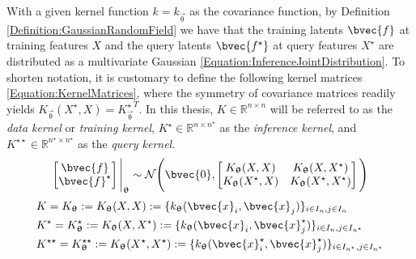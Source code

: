 				With a given kernel function $k = k_{\vec{\uptheta}}$ as the covariance function, by Definition \ref{Definition:GaussianRandomField} we have that the training latents $\bvec{f}$ at training features $X$ and the query latents $\bvec{f^{\star}}$ at query features $X^{\star}$ are distributed as a multivariate Gaussian \eqref{Equation:InferenceJointDistribution}. To shorten notation, it is customary to define the following kernel matrices \eqref{Equation:KernelMatrices}, where the symmetry of covariance matrices readily yields $K_{\vec{\uptheta}}(X^{\star}, X) = {K_{\vec{\uptheta}}^{\star}}^{T}$. In this thesis, $K \in \mathbb{R}^{n \times n}$ will be referred to as the \textit{data kernel} or \textit{training kernel}, $K^{\star} \in \mathbb{R}^{n \times n^{\star}}$ as the \textit{inference kernel}, and $K^{\star \star} \in \mathbb{R}^{n^{\star} \times n^{\star}}$ as the \textit{query kernel}. \begin{equation}
					\begin{bmatrix}
						\bvec{f} \\ \bvec{f}^{\star}
					\end{bmatrix} \Bigg|_{\vec{\uptheta}}
					\sim \mathcal{N}\Bigg(\bvec{0}, \begin{bmatrix}
														K_{\vec{\uptheta}}(X, X) & K_{\vec{\uptheta}}(X, X^{\star}) \\
														K_{\vec{\uptheta}}(X^{\star}, X) & K_{\vec{\uptheta}}(X^{\star}, X^{\star}) \\
													\end{bmatrix}  \Bigg)
				\label{Equation:InferenceJointDistribution}
				\end{equation} \begin{equation}
					\begin{aligned}
						& K = K_{\vec{\uptheta}} := K_{\vec{\uptheta}}(X, X) := \{k_{\vec{\uptheta}}(\bvec{x}_{i}, \bvec{x}_{j})\}_{i \in I_{n}, j \in I_{n}} \\
						& K^{\star} = K_{\vec{\uptheta}}^{\star} := K_{\vec{\uptheta}}(X, X^{\star}) := \{k_{\vec{\uptheta}}(\bvec{x}_{i}, \bvec{x}^{\star}_{j})\}_{i \in I_{n}, j \in I_{n^{\star}}} \\
						& K^{\star \star} = K_{\vec{\uptheta}}^{\star \star} := K_{\vec{\uptheta}}(X^{\star}, X^{\star}) := \{k_{\vec{\uptheta}}(\bvec{x}^{\star}_{i}, \bvec{x}^{\star}_{j})\}_{i \in I_{n^{\star}}, j \in I_{n^{\star}}}
					\end{aligned}
				\label{Equation:KernelMatrices}

\end{equation}
